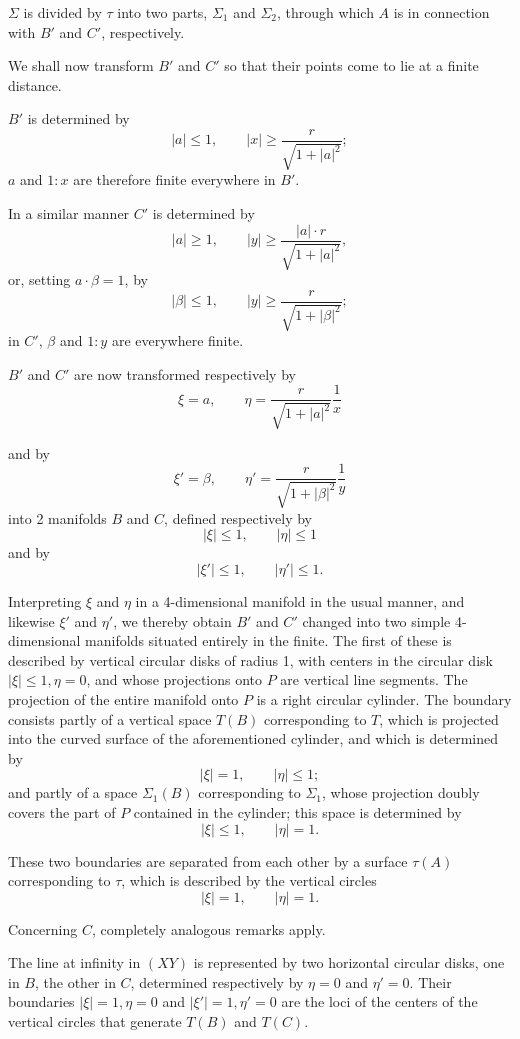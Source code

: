 \documentclass{article}
\begin{document}
$\Sigma$ is divided by $\tau$ into two parts, $\Sigma_1$ and $\Sigma_2$, through which $A$ is in connection with $B'$ and $C'$, respectively.

We shall now transform $B'$ and $C'$ so that their points come to lie at a finite distance.

$B'$ is determined by
\[
|a| \le 1, \qquad |x| \ge \frac{r}{\sqrt{1 + |a|^2}}; \tag{1}
\]
$a$ and $1 : x$ are therefore finite everywhere in $B'$.

In a similar manner $C'$ is determined by
\[
|a| \ge 1, \qquad |y| \ge \frac{|a| \cdot r}{\sqrt{1 + |a|^2}},
\]
or, setting $a \cdot \beta = 1$, by
\[
|\beta| \le 1, \qquad |y| \ge \frac{r}{\sqrt{1 + |\beta|^2}}; \tag{2}
\]
in $C'$, $\beta$ and $1 : y$ are everywhere finite.

$B'$ and $C'$ are now transformed respectively by
\[
\xi = a, \qquad \eta = \frac{r}{\sqrt{1 + |a|^2}} \frac{1}{x} \tag{3}
\]

and by
\[
\xi' = \beta, \qquad \eta' = \frac{r}{\sqrt{1 + |\beta|^2}} \frac{1}{y} \tag{4}
\]
into 2 manifolds $B$ and $C$, defined respectively by
\[
|\xi| \le 1, \qquad |\eta| \le 1
\]
and by
\[
|\xi'| \le 1, \qquad |\eta'| \le 1.
\]

Interpreting $\xi$ and $\eta$ in a 4-dimensional manifold in the usual manner, and likewise $\xi'$ and $\eta'$, we thereby obtain $B'$ and $C'$ changed into two simple 4-dimensional manifolds situated entirely in the finite. The first of these is described by vertical circular disks of radius 1, with centers in the circular disk $|\xi| \le 1, \eta = 0$, and whose projections onto $P$ are vertical line segments. The projection of the entire manifold onto $P$ is a right circular cylinder. The boundary consists partly of a vertical space $T(B)$ corresponding to $T$, which is projected into the curved surface of the aforementioned cylinder, and which is determined by
\[
|\xi| = 1, \qquad |\eta| \le 1;
\]
and partly of a space $\Sigma_1(B)$ corresponding to $\Sigma_1$, whose projection doubly covers the part of $P$ contained in the cylinder; this space is determined by
\[
|\xi| \le 1, \qquad |\eta| = 1.
\]

These two boundaries are separated from each other by a surface $\tau(A)$ corresponding to $\tau$, which is described by the vertical circles
\[
|\xi| = 1, \qquad |\eta| = 1.
\]

Concerning $C$, completely analogous remarks apply.

The line at infinity in $(XY)$ is represented by two horizontal circular disks, one in $B$, the other in $C$, determined respectively by $\eta = 0$ and $\eta' = 0$. Their boundaries $|\xi| = 1, \eta = 0$ and $|\xi'| = 1, \eta' = 0$ are the loci of the centers of the vertical circles that generate $T(B)$ and $T(C)$.
\end{document}
